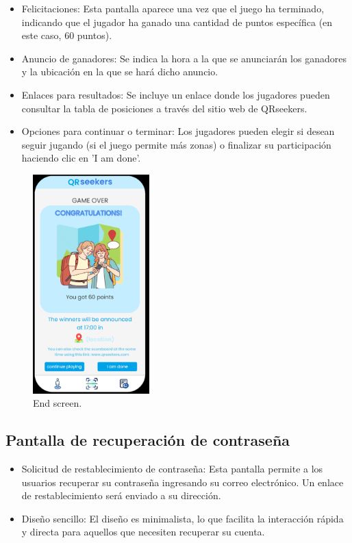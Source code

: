 \documentclass[letterpaper, 12pt]{report}
\begin{document}
\begin{itemize}
    \item Felicitaciones: Esta pantalla aparece una vez que el juego ha terminado, indicando que el jugador ha ganado una cantidad de puntos específica (en este caso, 60 puntos).
    \item Anuncio de ganadores: Se indica la hora a la que se anunciarán los ganadores y la ubicación en la que se hará dicho anuncio.
    \item Enlaces para resultados: Se incluye un enlace donde los jugadores pueden consultar la tabla de posiciones a través del sitio web de QRseekers.
    \item Opciones para continuar o terminar: Los jugadores pueden elegir si desean seguir jugando (si el juego permite más zonas) o finalizar su participación haciendo clic en 'I am done'.
\end{itemize}

\begin{figure}[H]
\centering
\includegraphics[width=0.4\textwidth]{figure11.png}
\caption{End screen.}
\label{fig:1}
\end{figure}

\subsection{Pantalla de recuperación de contraseña}

\begin{itemize}
    \item Solicitud de restablecimiento de contraseña: Esta pantalla permite a los usuarios recuperar su contraseña ingresando su correo electrónico. Un enlace de restablecimiento será enviado a su dirección.
    \item Diseño sencillo: El diseño es minimalista, lo que facilita la interacción rápida y directa para aquellos que necesiten recuperar su cuenta.
\end{itemize}
\end{document}
